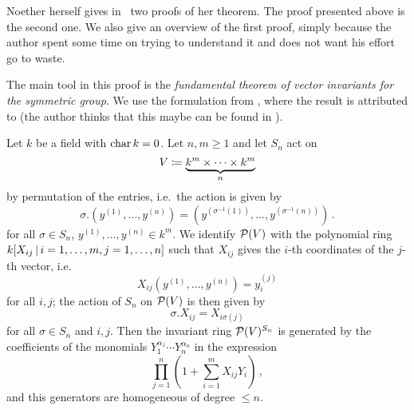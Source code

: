 \begin{fluff}
  Noether herself gives in~\cite{Noether1915} two proofs of her theorem.
  The proof presented above is the second one.
  We also give an overview of the first proof, simply because the author spent some time on trying to understand it and does not want his effort go to waste.
  
  The main tool in this proof is the \emph{fundamental theorem of vector invariants for the symmetric group}.
  We use the formulation from \cite{Fleischmann2000}, where the result is attributed to \cite{Weyl1946} (the author thinks that this maybe can be found in \cite[II.3]{Weyl1946}).
\end{fluff}


\begin{theorem}
  \label{theorem: fundamental theorem of vector invariants for the symmetric group}
  Let $k$ be a field with $\operatorname{char} k = 0$.
  Let $n, m \geq 1$ and let $S_n$ act on
  \[
              V
    \coloneqq  \underbrace{k^m \times \dotsb \times k^m}_n
  \]
  by permutation of the entries, i.e.\ the action is given by
  \[
      \sigma.\left( y^{(1)}, \dotsc, y^{(n)} \right)
    = \left( y^{(\sigma^{-1}(1))}, \dotsc, y^{(\sigma^{-1}(n))} \right) \,.
  \]
  for all $\sigma \in S_n$, $y^{(1)}, \dotsc, y^{(n)} \in k^m$.
  We identify $\mathcal{P}(V)$ with the polynomial ring $k[X_{ij} \suchthat i = 1, \dotsc, m, j = 1, \dotsc, n]$ such that $X_{ij}$ gives the $i$-th coordinates of the $j$-th vector, i.e.\
  \[
      X_{ij}(y^{(1)}, \dotsc, y^{(n)})
    = y^{(j)}_i
  \]
  for all $i,j$;
  the action of $S_n$ on $\mathcal{P}(V)$ is then given by
  \[
      \sigma.X_{ij}
    = X_{i \sigma(j)}
  \]
  for all $\sigma \in S_n$ and $i,j$.
  Then the invariant ring $\mathcal{P}(V)^{S_n}$ is generated by the coefficients of the monomials $Y_1^{\alpha_1} \dotsb Y_n^{\alpha_n}$ in the expression
  \[
    \prod_{j=1}^n \left( 1 + \sum_{i=1}^m X_{ij} Y_i \right) \,,
  \]
  and this generators are homogeneous of degree $\leq n$.
\end{theorem}


